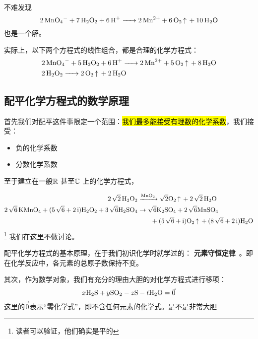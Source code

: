 \documentclass{ctexart}
\begin{document}
不难发现\[
    \ce{2 MnO4^- + 7 H2O2 + 6 H^+ -> 2 Mn^2+ + 6 O2 ^ + 10 H2O}
\]
也是一个解。

实际上，以下两个方程式的线性组合，都是合理的化学方程式：
\begin{align*}
    &\ce{2 MnO4^- + 5 H2O2 + 6 H^+ -> 2 Mn^2+ + 5 O2 ^ + 8 H2O} \\
    &\ce{2 H2O2 -> 2 O2 ^ + 2 H2O}
\end{align*}

\subsection{配平化学方程式的数学原理}

首先我们对配平这件事限定一个范围：\hl{我们最多能接受有理数的化学系数}，我们接受：

\begin{itemize}
    \item \checkmark 负的化学系数
    \item \checkmark 分数化学系数
\end{itemize}
至于建立在一般\(\mathbb{R}\)
甚至\(\mathbb{C}\) 上的化学方程式，

\begin{align*}
    \ce{2\sqrt{2} H2O2 &->[MnO2] \sqrt{2}O2 ^ + 2\sqrt{2} H2O}\\
    \ce{2\sqrt{6} KMnO4 + (5\sqrt{6} + 2\i)H2O2 + 3\sqrt{6}H2SO4 &\to
        \sqrt{6}K2SO4 + 2\sqrt{6}MnSO4 \\
    & \qquad {} + (5\sqrt{6} + \i)O2 ^ + (8\sqrt{6} + 2\i)H2O}
\end{align*}\footnote{读者可以验证，他们确实是平的}
我们在这里不做讨论。

配平化学方程式的基本原理，在于我们初识化学时就学过的：
\textbf{元素守恒定律}~\cite{HuaXueJiuNianJiShangCe}。即在化学反应中，各元素的总原子数保持不变。

其次，作为数学对象，我们有充分的理由大胆的对化学方程式进行移项：
\[
    x \ce{H2S} + y \ce{SO2} - z \ce{S} - t \ce{H2O} = \vec{0}
\]
这里的\(\vec{0}\)表示“零化学式”，即不含任何元素的化学式。是不是非常大胆 
\end{document}
